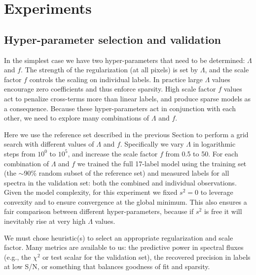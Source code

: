 \documentclass[12pt,preprint]{aastex6}
\begin{document}
\section{Experiments}
\label{sec:experiments}


\subsection{Hyper-parameter selection and validation}
\label{sec:hyper-parameter-validation}


In the simplest case we have two hyper-parameters that need to be determined: 
$\Lambda$ and $f$.  The strength of the regularization (at all pixels) is set 
by $\Lambda$, and the scale factor $f$ controls the scaling on individual 
labels.  In practice large $\Lambda$ values encourage zero coefficients and thus enforce sparsity.  High scale factor $f$
values act to penalize cross-terms more than linear labels, and produce sparse
models as a consequence.  Because these hyper-parameters act in conjunction 
with each other, we need to explore many combinations of $\Lambda$ and $f$.


Here we use the reference set described in the previous Section to perform a
grid search with different values of $\Lambda$ and $f$.  Specifically we vary 
$\Lambda$ in logarithmic steps from $10^0$ to $10^5$, and increase the 
scale factor $f$ from 0.5 to 50.  For each combination of $\Lambda$ and $f$ we 
trained the full 17-label model using the training set (the $\sim$90\% random
subset of the reference set) and measured labels for all spectra in the
validation set: both the combined and individual observations.  Given the model
complexity, for this experiment we fixed $s^2 = 0$ to leverage convexity
and to ensure convergence at the global minimum.  This also ensures a fair
comparison between different hyper-parameters, because if $s^2$ is free it
will inevitably rise at very high $\Lambda$ values.  


We must chose heuristic(s) to select an appropriate regularization and scale
factor.  Many metrics are available to us: the predictive power in spectral
fluxes (e.g., the $\chi^2$ or test scalar for the validation set), the 
recovered precision in labels at low S/N, or something that balances goodness of fit and sparsity.
\end{document}
